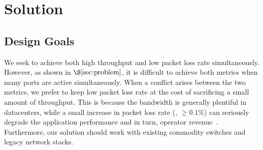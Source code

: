 \section{Solution}\label{sec:design}
\subsection{Design Goals}\label{subsec:design_goals}
We seek to achieve both high throughput and low packet loss rate simultaneously. However, as shown in $\S\ref{sec:problem}$, it is difficult to achieve both metrics when many ports are active simultaneously. When a conflict arises between the two metrics, we prefer to keep low packet loss rate at the cost of sacrificing a small amount of throughput. This is because the bandwidth is generally plentiful in datacenters, while a small increase in packet loss rate (\eg, $\geq0.1\%$) can seriously degrade the application performance and in turn, operator revenue~\cite{timely}. Furthermore, our solution should work with existing commodity switches and legacy network stacks.


